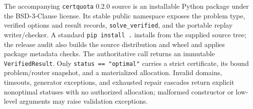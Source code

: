 \documentclass[smallextended,envcountsect]{svjour3}
\begin{document}
The accompanying \texttt{certquota} 0.2.0 source is an installable Python
package under the BSD-3-Clause license.  Its stable public namespace exposes the
problem type, verified options and result records, \texttt{solve\_verified}, and
the portable replay writer/checker.  A standard
\texttt{pip install .} installs from the supplied source tree; the release audit
also builds the source distribution and wheel and applies package metadata
checks.  The authoritative call returns an immutable \texttt{VerifiedResult}.
Only \texttt{status == "optimal"} carries a strict certificate, its bound
problem/router snapshot, and a materialized allocation.  Invalid domains,
timeouts, generator exceptions, and exhausted repair cascades return explicit
nonoptimal statuses with no authorized allocation; malformed constructor or
low-level arguments may raise validation exceptions.
\end{document}

